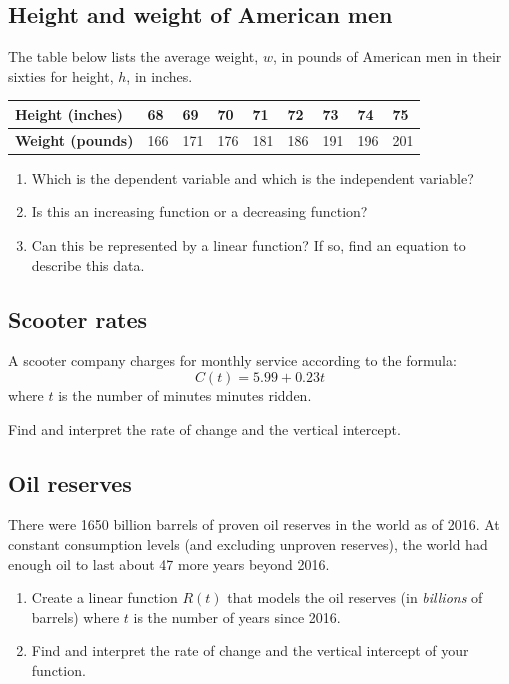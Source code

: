 \documentclass[
]{book}
\providecommand{\tightlist}{%
  \setlength{\itemsep}{0pt}\setlength{\parskip}{0pt}}
\begin{document}
\hypertarget{height-and-weight-of-american-men}{%
\subsection{Height and weight of American men}\label{height-and-weight-of-american-men}}

The table below lists the average weight, \(w\), in pounds of American men in their sixties for height, \(h\), in inches.

\begin{longtable}[]{@{}lllllllll@{}}
\toprule
\textbf{Height (inches)} & 68 & 69 & 70 & 71 & 72 & 73 & 74 & 75\tabularnewline
\midrule
\endhead
\textbf{Weight (pounds)} & 166 & 171 & 176 & 181 & 186 & 191 & 196 & 201\tabularnewline
\bottomrule
\end{longtable}

\begin{enumerate}
\def\labelenumi{\arabic{enumi}.}
\tightlist
\item
  Which is the dependent variable and which is the independent variable?\\
\item
  Is this an increasing function or a decreasing function?
\item
  Can this be represented by a linear function? If so, find an equation to describe this data.
\end{enumerate}

\hypertarget{scooter-rates}{%
\subsection{Scooter rates}\label{scooter-rates}}

A scooter company charges for monthly service according to the formula:
\[C(t) =  5.99 + 0.23 t\]
where \(t\) is the number of minutes minutes ridden.

Find and interpret the rate of change and the vertical intercept.

\hypertarget{oil-reserves}{%
\subsection{Oil reserves}\label{oil-reserves}}

There were 1650 billion barrels of proven oil reserves in the world as of 2016. At constant consumption levels (and excluding unproven reserves), the world had enough oil to last about 47 more years beyond 2016.

\begin{enumerate}
\def\labelenumi{\arabic{enumi}.}
\tightlist
\item
  Create a linear function \(R(t)\) that models the oil reserves (in \emph{billions} of barrels) where \(t\) is the number of years since 2016.
\item
  Find and interpret the rate of change and the vertical intercept of your function.
\end{enumerate}
\end{document}
